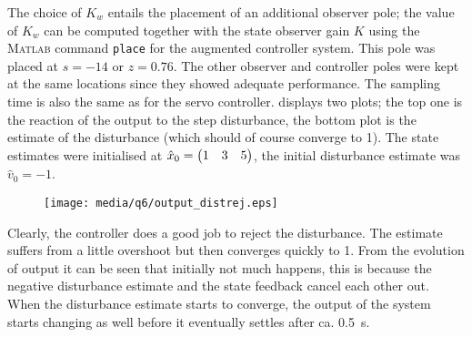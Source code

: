 The choice of $K_w$ entails the placement of an additional observer pole; the value of $K_w$ can be computed together with the state observer gain $K$ using the \textsc{Matlab} command \texttt{place} for the augmented controller system. This pole was placed at $s = -14$ or $z = 0.76$. The other observer and controller poles were kept at the same locations since they showed adequate performance. The sampling time is also the same as for the servo controller.
 displays two plots; the top one is the reaction of the output to the step disturbance, the bottom plot is the estimate of the disturbance (which should of course converge to 1). The state estimates were initialised at $\hat{x}_0 = \mqty(1 & 3 & 5)$, the initial disturbance estimate was $\hat{v}_0 = -1$.
\begin{figure}[ht!]
    \centering
    \texttt{[image: media/q6/output\_distrej.eps]}
    \caption{}
    \label{fig:q6_output_distrej}
\end{figure}
Clearly, the controller does a good job to reject the disturbance. The estimate suffers from a little overshoot but then converges quickly to 1. From the evolution of output it can be seen that initially not much happens, this is because the negative disturbance estimate and the state feedback cancel each other out. When the disturbance estimate starts to converge, the output of the system starts changing as well before it eventually settles after ca. \SI{0.5}{\second}.
